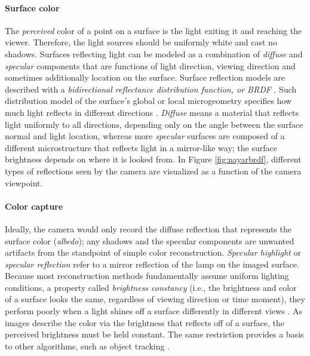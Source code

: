 \paragraph{Surface color}
The \emph{perceived} color of a point on a surface is the light exiting it and reaching the viewer.
Therefore, the light sources should be uniformly white and cast no shadows.
Surfaces reflecting light can be modeled as a combination of \emph{diffuse} and \emph{specular} components that are functions of light direction, viewing direction and sometimes additionally location on the surface.
Surface reflection models are described with a \emph{bidirectional reflectance distribution function, or BRDF} \cite{nicodemus1965directional}.
Such distribution model of the surface's global or local microgeometry specifies how much light reflects in different directions \cite{nayar1991surface}. %
\emph{Diffuse} means a material that reflects light uniformly to all directions, depending only on the angle between the surface normal and light location, whereas more \emph{specular} surfaces are composed of a different microstructure that reflects light in a mirror-like way; the surface brightness depends on where it is looked from.
In Figure \ref{fig:nayarbrdf}, different types of reflections seen by the camera are visualized as a function of the camera viewpoint.


\paragraph{Color capture}
Ideally, the camera would only record the diffuse reflection that represents the surface color (\emph{albedo});
any shadows and the specular components are unwanted artifacts from the standpoint of simple color reconstruction.
\emph{Specular highlight} or \emph{specular reflection} refer to a mirror reflection of the lamp on the imaged surface.
Because most reconstruction methods fundamentally assume uniform lighting conditions, a property called \emph{brightness constancy} (i.e., the brightness and color of a surface looks the same, regardless of viewing direction or time moment), they perform poorly when a light shines off a surface differently in different views \cite[ch. 8.3]{trucco1998introductory}.
As images describe the color via the brightness that reflects off of a surface, the perceived brightness must be held constant.
The same restriction provides a basis to other algorithms, such as object tracking \cite{horn1974determining,horn1981determining}.

